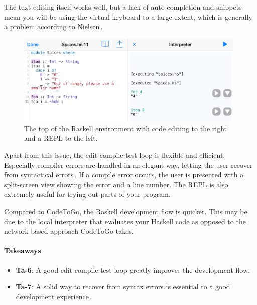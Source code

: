 The text editing itself works well, but a lack of auto completion and snippets mean you will be using the virtual keyboard to a large extent, which is generally a problem according to Nielsen\,\cite[pp. 76]{nielsen2013mobile}. 

\begin{figure}
	\centering
		\includegraphics[width=110mm]{diagrams/Raskell_screenshot.png}
	\caption{The top of the Raskell environment with code editing to the right and a REPL to the
	left.}
\label{fig:Raskell_screenshot}
\end{figure}

Apart from this issue, the edit-compile-test loop is flexible and efficient. Especially compiler errors are handled in an elegant way, letting the user recover from syntactical errors\,\cite{nielsen1990heuristic}. If a compile error occurs, the user is presented with a split-screen view showing the error and a line number. The REPL is also extremely useful for trying out parts of your program.

Compared to CodeToGo, the Raskell development flow is quicker. This may be due to the local interpreter that evaluates your Haskell code as opposed to the network based approach CodeToGo takes.

\paragraph{Takeaways}
\begin{itemize}
	\item \textbf{Ta-6}: A good edit-compile-test loop greatly improves the development flow.
	\item \textbf{Ta-7}: A solid way to recover from syntax errors is essential to a good development experience\,\cite{nielsen1990heuristic}.
\end{itemize}

\paragraph{}

